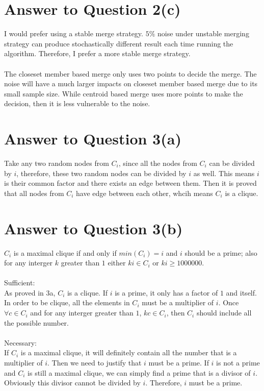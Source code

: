 \documentclass[11pt]{article}
\begin{document}
\pagebreak[4]
\section*{Answer to Question 2(c)}
I would prefer using a stable merge strategy.
$5\%$ noise under unstable merging strategy can produce stochastically different result each time running the algorithm.
Therefore, I prefer a more stable merge strategy.\\
\\
The closeset member based merge only uses two points to decide the merge.
The noise will have a much larger impacts on closeset member based merge due to its small sample size.
While centroid based merge uses more points to make the decision, then it is less vulnerable to the noise.

\pagebreak[4]
\section*{Answer to Question 3(a)}
Take any two random nodes from $C_i$, since all the nodes from $C_i$ can be divided by $i$,
therefore, these two random nodes can be divided by $i$ as well. This means $i$ is their common factor and there exists an edge between them.
Then it is proved that all nodes from $C_i$ have edge between each other, whcih means $C_i$ is a clique.

\pagebreak[4]
\section*{Answer to Question 3(b)}
$C_i$ is a maximal clique if and only if $min(C_i) = i$ and $i$ should be a prime; also for any interger $k$ greater than $1$ either $ki \in C_i$ or $ki \geq 1000000$.\\
\\
Sufficient:\\
As proved in 3a, $C_i$ is a clique. If $i$ is a prime, it only has a factor of $1$ and itself. In order to be clique, all the elements in $C_i$ must be a multiplier of $i$.
Once $\forall c\in C_i$ and for any interger greater than $1$, $kc \in C_i$, then $C_i$ should include all the possible number.\\
\\
Necessary:\\
If $C_i$ is a maximal clique, it will definitely contain all the number that is a multiplier of $i$.
Then we need to justify that $i$ must be a prime. If $i$ is not a prime and $C_i$ is still a maximal clique, we can simply find a prime that is a divisor of $i$.
Obviously this divisor cannot be divided by $i$. Therefore, $i$ must be a prime.
\end{document}
